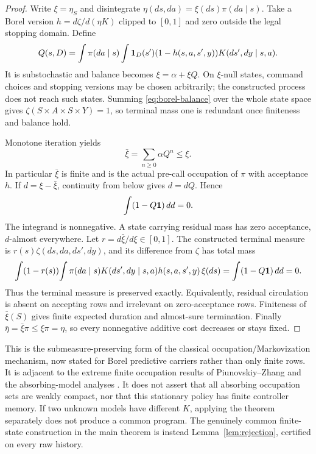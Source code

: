 \begin{proof}
Write $\xi=\eta_S$ and disintegrate $\eta(ds,da)=\xi(ds)\pi(da\mid s)$. Take a Borel version $h=d\zeta/d(\eta K)$ clipped to $[0,1]$ and zero outside the legal stopping domain. Define
\[
 Q(s,D)=\int\pi(da\mid s)\int\mathbf1_D(s')(1-h(s,a,s',y))K(ds',dy\mid s,a).
\]
It is substochastic and balance becomes $\xi=\alpha+\xi Q$. On $\xi$-null states, command choices and stopping versions may be chosen arbitrarily; the constructed process does not reach such states. Summing \eqref{eq:borel-balance} over the whole state space gives $\zeta(S\times A\times S\times Y)=1$, so terminal mass one is redundant once finiteness and balance hold.

Monotone iteration yields
\[
 \bar\xi=\sum_{n\ge0}\alpha Q^n\le\xi.
\]
In particular $\bar\xi$ is finite and is the actual pre-call occupation of $\pi$ with acceptance $h$. If $d=\xi-\bar\xi$, continuity from below gives $d=dQ$. Hence
\[
 \int(1-Q\mathbf1)\,dd=0.
\]
The integrand is nonnegative. A state carrying residual mass has zero acceptance, $d$-almost everywhere. Let $r=d\bar\xi/d\xi\in[0,1]$. The constructed terminal measure is $r(s)\zeta(ds,da,ds',dy)$, and its difference from $\zeta$ has total mass
\[
 \int(1-r(s))\!\int\pi(da\mid s)K(ds',dy\mid s,a)h(s,a,s',y)\,\xi(ds)
   =\int(1-Q\mathbf1)\,dd=0.
\]
Thus the terminal measure is preserved exactly. Equivalently, residual circulation is absent on accepting rows and irrelevant on zero-acceptance rows. Finiteness of $\bar\xi(S)$ gives finite expected duration and almost-sure termination. Finally $\bar\eta=\bar\xi\pi\le\xi\pi=\eta$, so every nonnegative additive cost decreases or stays fixed.
\end{proof}

This is the submeasure-preserving form of the classical occupation/Markovization mechanism, now stated for Borel predictive carriers rather than only finite rows. It is adjacent to the extreme finite occupation results of Piunovskiy--Zhang \cite{PZExtreme} and the absorbing-model analyses \cite{PZContinuity,DPAbsorb,DPChatter,DPMixture}. It does not assert that all absorbing occupation sets are weakly compact, nor that this stationary policy has finite controller memory. If two unknown models have different $K$, applying the theorem separately does not produce a common program. The genuinely common finite-state construction in the main theorem is instead Lemma~\ref{lem:rejection}, certified on every raw history.
